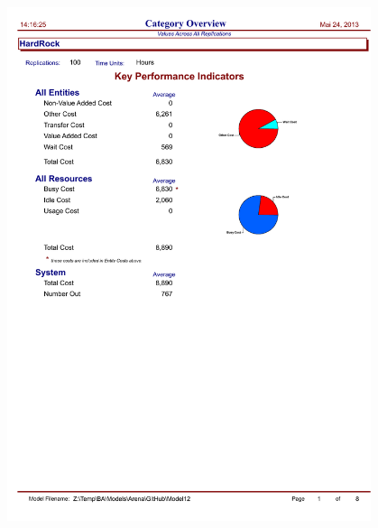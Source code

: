\documentclass[ngerman,a4paper,12pt]{scrreprt}
\begin{document}
	\begin{figure}[H]
		\begin{center}
		\includegraphics[page=2, width=0.95\textwidth]{../Auswertung/Raport 14-3-9/category overview.pdf}
		\end{center}
	\end{figure}
\end{document}
